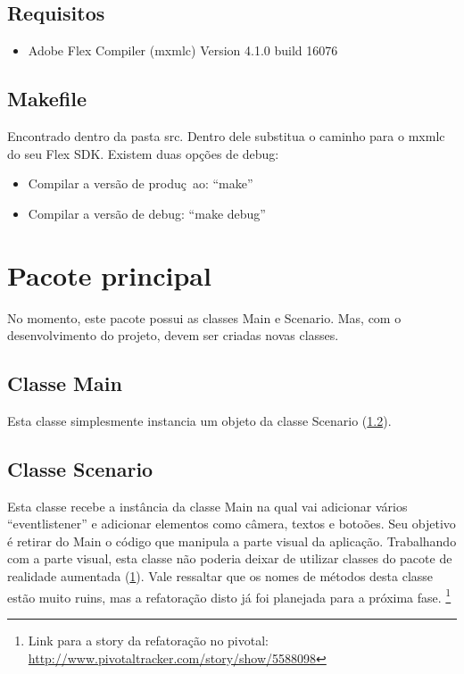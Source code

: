 \documentclass[a4paper,12pt]{book}
\begin{document}
	\subsection{Requisitos}
	\label{subsec:ecrequisitos}
	\begin{itemize}
		\item{Adobe Flex Compiler (mxmlc) Version 4.1.0 build 16076}
	\end{itemize}
	
	\subsection{Makefile}
	Encontrado dentro da pasta src. Dentro dele substitua o caminho para o mxmlc do
	seu Flex SDK.
	Existem duas op\c c\~oes de debug:
	\begin{itemize}
	  \item{Compilar a vers\~ao de produ\c c~ao: ``make''}
	  \item{Compilar a vers\~ao de debug: ``make debug''}
	\end{itemize}
	
	\section{Pacote principal}
		\label{sec:pcpacoteaugmentedreality}
		
		No momento, este pacote possui as classes Main e Scenario. Mas, com o
		desenvolvimento do projeto, devem ser criadas novas classes.
		
		\subsection{Classe Main}
		\label{subsec:ecclassemain}
		Esta classe simplesmente instancia um objeto da classe
		Scenario (\ref{subsec:ecclassescenario}).
		
		\subsection{Classe Scenario}
		\label{subsec:ecclassescenario}
		Esta classe recebe a inst\^ancia da classe Main na qual vai adicionar v\'arios
		``eventlistener'' e adicionar elementos como c\^amera, textos e boto\~oes. Seu
		objetivo \'e retirar do Main o c\'odigo que manipula a parte visual da
		aplica\c c\~ao.
		Trabalhando com a parte visual, esta classe n\~ao poderia deixar de utilizar
		classes do pacote de realidade aumentada (\ref{sec:pcpacoteaugmentedreality}).
		Vale ressaltar que os nomes de m\'etodos desta classe est\~ao muito ruins, mas
		a refatora\c c\~ao disto j\'a foi planejada para a pr\'oxima fase.
		\footnote{Link para a story da refatora\c c\~ao no pivotal:	\url{http://www.pivotaltracker.com/story/show/5588098}}
		
\end{document}
